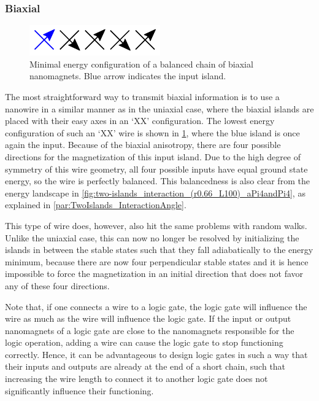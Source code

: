 \documentclass[11pt,a4paper,english]{article}
\begin{document}
\subsubsection{Biaxial}
\begin{figure}
    \centering
    \includegraphics[width=0.5\columnwidth]{Figures/Introduction/Biaxial_chain.pdf}
    \caption{Minimal energy configuration of a balanced chain of biaxial nanomagnets. Blue arrow indicates the input island.}
    \label{fig:Intro_IslandBiaxialChainGeometry}
\end{figure}
The most straightforward way to transmit biaxial information is to use a nanowire in a similar manner as in the uniaxial case, where the biaxial islands are placed with their easy axes in an `XX' configuration. The lowest energy configuration of such an `XX' wire is shown in \cref{fig:Intro_IslandBiaxialChainGeometry}, where the blue island is once again the input. Because of the biaxial anisotropy, there are four possible directions for the magnetization of this input island. Due to the high degree of symmetry of this wire geometry, all four possible inputs have equal ground state energy, so the wire is perfectly balanced. This balancedness is also clear from the energy landscape in \cref{fig:two-islands_interaction_(r0.66_L100)_aPi4andPi4}, as explained in \cref{par:TwoIslands_InteractionAngle}. \par
This type of wire does, however, also hit the same problems with random walks. Unlike the uniaxial case, this can now no longer be resolved by initializing the islands in between the stable states such that they fall adiabatically to the energy minimum, because there are now four perpendicular stable states and it is hence impossible to force the magnetization in an initial direction that does not favor any of these four directions. \par
Note that, if one connects a wire to a logic gate, the logic gate will influence the wire as much as the wire will influence the logic gate. If the input or output nanomagnets of a logic gate are close to the nanomagnets responsible for the logic operation, adding a wire can cause the logic gate to stop functioning correctly. Hence, it can be advantageous to design logic gates in such a way that their inputs and outputs are already at the end of a short chain, such that increasing the wire length to connect it to another logic gate does not significantly influence their functioning.
\end{document}
